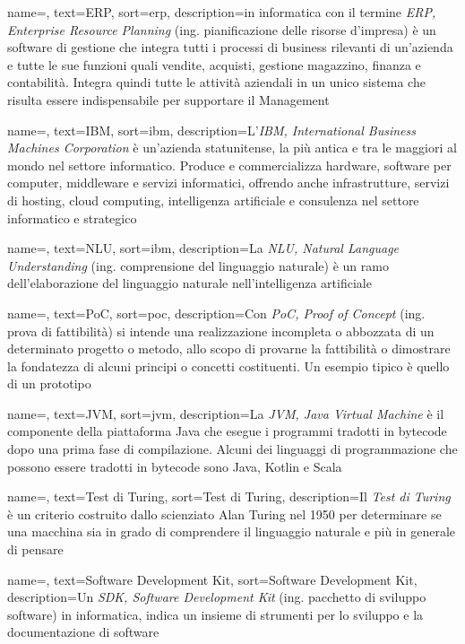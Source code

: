{
    name=,
    text=ERP,
    sort=erp,
    description={in informatica con il termine \emph{ERP, Enterprise Resource Planning} (ing. pianificazione delle risorse d'impresa) è un software di gestione che integra tutti i processi di business rilevanti di un'azienda e tutte le sue funzioni quali vendite, acquisti, gestione magazzino, finanza e contabilità. Integra quindi tutte le attività aziendali in un unico sistema che risulta essere indispensabile per supportare il Management}
}

{
	name=,
	text=IBM,
	sort=ibm,
	description={L'\emph{IBM, International Business Machines Corporation} è un'azienda statunitense, la più antica e tra le maggiori al mondo nel settore informatico. Produce e commercializza hardware, software per computer, middleware e servizi informatici, offrendo anche infrastrutture, servizi di hosting, cloud computing, intelligenza artificiale e consulenza nel settore informatico e strategico}
}

{
	name=,
	text=NLU,
	sort=ibm,
	description={La \emph{NLU, Natural Language Understanding} (ing. comprensione del linguaggio naturale) è un ramo dell'elaborazione del linguaggio naturale nell'intelligenza artificiale}
}

{
	name=,
	text=PoC,
	sort=poc,
	description={Con \emph{PoC, Proof of Concept} (ing. prova di fattibilità) si intende una realizzazione incompleta o abbozzata di un determinato progetto o metodo, allo scopo di provarne la fattibilità o dimostrare la fondatezza di alcuni principi o concetti costituenti. Un esempio tipico è quello di un prototipo}
}

{
	name=,
	text=JVM,
	sort=jvm,
	description={La \emph{JVM, Java Virtual Machine} è il componente della piattaforma Java che esegue i programmi tradotti in bytecode dopo una prima fase di compilazione. Alcuni dei linguaggi di programmazione che possono essere tradotti in bytecode sono Java, Kotlin e Scala}
}

{
	name=,
	text=Test di Turing,
	sort=Test di Turing,
	description={Il \emph{Test di Turing} è un criterio costruito dallo scienziato Alan Turing nel 1950 per determinare se una macchina sia in grado di comprendere il linguaggio naturale e più in generale di pensare}
}

{
	name=,
	text=Software Development Kit,
	sort=Software Development Kit,
	description={Un \emph{SDK, Software Development Kit} (ing. pacchetto di sviluppo software) in informatica, indica un insieme di strumenti per lo sviluppo e la documentazione di software}
}

